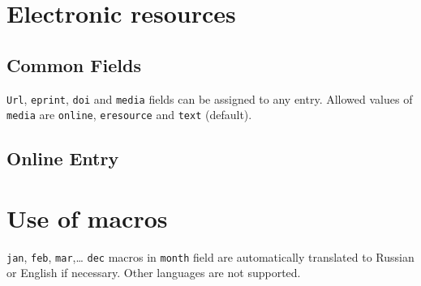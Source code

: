 \documentclass[a4paper]{article}
\begin{document}
\section{Electronic resources}

\subsection{Common Fields}
\verb|Url|, \verb|eprint|, \verb|doi| and \verb|media| fields can be assigned to any entry. Allowed values of \verb|media| are \verb|online|, \verb|eresource| and \verb|text| (default).

\subsection{Online Entry}


\section{Use of macros}

\texttt{jan}, \texttt{feb}, \texttt{mar},\ldots{} \texttt{dec} macros in \texttt{month} field
are automatically translated to Russian or English if necessary. Other languages are not supported.
\end{document}

